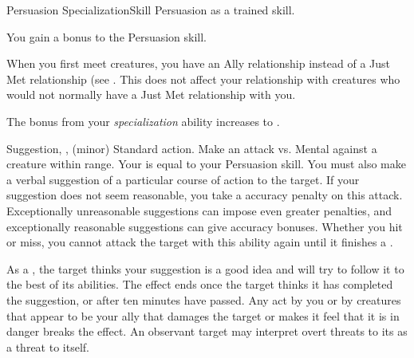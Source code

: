   \begin{feat}{Persuasion Specialization}{Skill}
    \featpre Persuasion as a trained skill.

     You gain a  bonus to the Persuasion skill.

     When you first meet creatures, you have an Ally relationship instead of a Just Met relationship (see .
    This does not affect your relationship with creatures who would not normally have a Just Met relationship with you.

     The bonus from your \textit{specialization} ability increases to .

    \begin{sustainability}{Suggestion}{, ,  (minor)}
      \abilityusagetime Standard action.
      \rankline
      Make an attack vs. Mental against a creature within \rngmed range.
      Your  is equal to your Persuasion skill.
      You must also make a verbal suggestion of a particular course of action to the target.
      If your suggestion does not seem reasonable, you take a  accuracy penalty on this attack.
      Exceptionally unreasonable suggestions can impose even greater penalties, and exceptionally reasonable suggestions can give accuracy bonuses.
      Whether you hit or miss, you cannot attack the target with this ability again until it finishes a .

      \hit As a , the target thinks your suggestion is a good idea and will try to follow it to the best of its abilities.
      The effect ends once the target thinks it has completed the suggestion, or after ten minutes have passed.
      Any act by you or by creatures that appear to be your ally that damages the target or makes it feel that it is in danger breaks the effect.
      An observant target may interpret overt threats to its  as a threat to itself.
    \end{sustainability}
  \end{feat}

